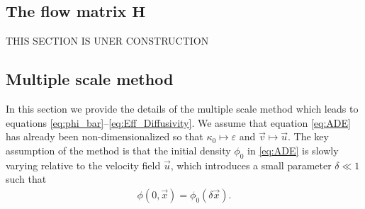 \documentclass[11pt]{amsart}
\newcommand{\Hb}{\mathbf{H}}
\begin{document}
\subsection{The flow matrix $\Hb$}\label{eq:flow_matrix}
%
THIS SECTION IS UNER CONSTRUCTION
%
\subsection{Multiple scale method}\label{sec:Multiscal_Method}
%
In this section we provide the details of the multiple scale method
\cite{McLaughlin:SIAM_JAM:780,Papanicolaou:1981:36:8,Papanicolaou:RF-835,Bensoussan:Book:1978}
which leads to equations
\eqref{eq:phi_bar}--\eqref{eq:Eff_Diffusivity}. We assume that
equation \eqref{eq:ADE} has already been non-dimensionalized so that
$\kappa_0\mapsto\varepsilon$ and $\vec{v}\mapsto\vec{u}$. The key assumption of the method is
that the initial density $\phi_0$ in \eqref{eq:ADE} is slowly
varying relative to the velocity field $\vec{u}$, which introduces a
small parameter $\delta\ll1$ such that  
% 
\begin{align}\label{eq:IC}
  \phi(0,\vec{x})=\phi_0(\delta\vec{x}).
\end{align}
%
\end{document}
